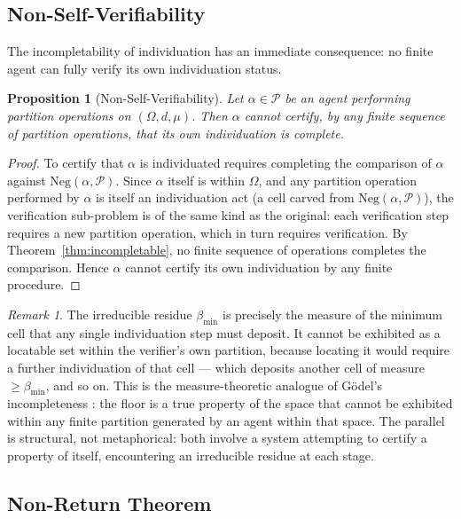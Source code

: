 \documentclass[12pt,a4paper,twocolumn]{article}
\theoremstyle{plain}
\newtheorem{proposition}[theorem]{Proposition}
\theoremstyle{definition}
\theoremstyle{remark}
\newtheorem{remark}[theorem]{Remark}
\newcommand{\Part}{\mathcal{P}}
\newcommand{\bmin}{\beta_{\min}}
\newcommand{\Neg}{\mathrm{Neg}}
\newcommand{\BRS}{(\Omega,d,\mu)}
\begin{document}
\subsection{Non-Self-Verifiability}

The incompletability of individuation has an immediate consequence: no finite
agent can fully verify its own individuation status.

\begin{proposition}[Non-Self-Verifiability]
\label{prop:non-self-verify}
Let $\alpha \in \Part$ be an agent performing partition operations on $\BRS$.
Then $\alpha$ cannot certify, by any finite sequence of partition operations,
that its own individuation is complete.
\end{proposition}

\begin{proof}
To certify that $\alpha$ is individuated requires completing the comparison
of $\alpha$ against $\Neg(\alpha, \Part)$.  Since $\alpha$ itself is within
$\Omega$, and any partition operation performed by $\alpha$ is itself an
individuation act (a cell carved from $\Neg(\alpha, \Part)$), the
verification sub-problem is of the same kind as the original: each
verification step requires a new partition operation, which in turn requires
verification.  By Theorem~\ref{thm:incompletable}, no finite sequence of
operations completes the comparison.  Hence $\alpha$ cannot certify its own
individuation by any finite procedure.
\end{proof}

\begin{remark}
The irreducible residue $\bmin$ is precisely the measure of the minimum cell
that any single individuation step must deposit.  It cannot be exhibited as
a locatable set within the verifier's own partition, because locating it
would require a further individuation of that cell --- which deposits another
cell of measure $\geq \bmin$, and so on.  This is the measure-theoretic
analogue of G\"{o}del's incompleteness \citep{godel1931formal}: the floor
is a true property of the space that cannot be exhibited within any finite
partition generated by an agent within that space.  The parallel is
structural, not metaphorical: both involve a system attempting to certify
a property of itself, encountering an irreducible residue at each stage.
\end{remark}

\subsection{Non-Return Theorem}
\end{document}
